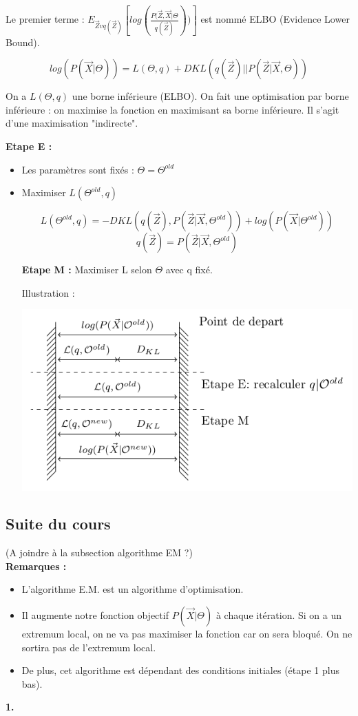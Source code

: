 \documentclass{article}
\begin{document}
Le premier terme : $ E_{\vec{Z} v q(\vec{Z})} [log(\frac{P(\vec{Z}, \vec{X} | \Theta}{q(\vec{Z})}))] $ est nommé ELBO (Evidence Lower Bound).

\[ log(P(\vec{X} | \Theta)) = L(\Theta, q) + DKL(q(\vec{Z}) || P(\vec{Z} | \vec{X}, \Theta))  \]

On a $L(\Theta, q)$ une borne inférieure (ELBO). On fait une optimisation par borne inférieure : on maximise la fonction en maximisant sa borne inférieure. Il s'agit d'une maximisation "indirecte".

\textbf{Etape E :} 
\begin{itemize}
\item Les paramètres sont fixés : $\Theta = \Theta^{old}$
\item Maximiser $L(\Theta^{old}, q)$

\[ L(\Theta^{old}, q) = - DKL(q(\vec{Z}), P(\vec{Z} | \vec{X}, \Theta^{old})) + log (P(\vec{X} | \Theta^{old})) \]
\[ q(\vec{Z}) = P(\vec{Z} | \vec{X}, \Theta^{old})  \]

\textbf{Etape M :} Maximiser L selon $\Theta$ avec q fixé.

Illustration :

\includegraphics[scale=0.4]{schema5.png}

\end{itemize}

\subsection{Suite du cours}

(A joindre à la subsection algorithme EM ?) \\
\textbf{Remarques :}
\begin{itemize}
\item L'algorithme E.M. est un algorithme d'optimisation.
\item Il augmente notre fonction objectif $P(\vec{X} | \Theta)$ à chaque itération. Si on a un extremum local, on ne va pas maximiser la fonction car on sera bloqué. On ne sortira pas de l'extremum local.
\item De plus, cet algorithme est dépendant des conditions initiales (étape 1 plus bas).
\end{itemize}
\textbf{1.}
\end{document}
